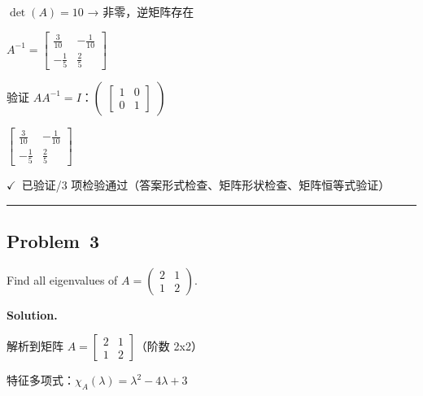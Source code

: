 \documentclass[12pt, a4paper]{article}
\newcommand{\problem}[1]{\subsection*{Problem~#1}}
\newcommand{\solution}{%
  \par\noindent
  {\color{solutiongreen}\bfseries Solution.}\par
}
\newcommand{\verifyok}{\textcolor{solutiongreen}{\ensuremath{\checkmark}\ 已验证}}
\begin{document}
\begin{stepbox}
$\det(A) = 10$ → 非零，逆矩阵存在
\end{stepbox}

\begin{stepbox}
$A^{-1} = \left[\begin{matrix}\frac{3}{10} & - \frac{1}{10}\\- \frac{1}{5} & \frac{2}{5}\end{matrix}\right]$
\end{stepbox}

\begin{stepbox}
验证 $AA^{-1} = I$：$\begin{pmatrix}\left[\begin{matrix}1 & 0\\0 & 1\end{matrix}\right]\end{pmatrix}$
\end{stepbox}

\begin{center}
$\boxed{\left[\begin{matrix}\frac{3}{10} & - \frac{1}{10}\\- \frac{1}{5} & \frac{2}{5}\end{matrix}\right]}$
\end{center}

\begin{verifybox}\small \verifyok{}/3 项检验通过（答案形式检查、矩阵形状检查、矩阵恒等式验证） \end{verifybox}

\vspace{0.8em}\hrule\vspace{0.8em}

\problem{3}

\begin{stepbox}
Find all eigenvalues of $A = \begin{pmatrix} 2 & 1 \\ 1 & 2 \end{pmatrix}$.
\end{stepbox}

\solution

\begin{stepbox}
解析到矩阵 $A = \left[\begin{matrix}2 & 1\\1 & 2\end{matrix}\right]$（阶数 2x2）
\end{stepbox}

\begin{stepbox}
特征多项式：$\chi_A(\lambda) = \lambda^{2} - 4 \lambda + 3$
\end{stepbox}
\end{document}
